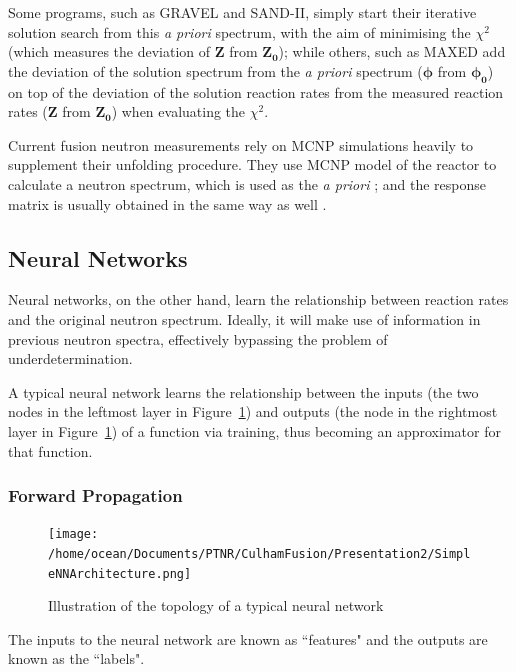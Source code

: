 \documentclass[a4paper, 12pt]{article}
\newcommand{\ve}[1]{\boldsymbol{#1}}
\begin{document}
Some programs, such as GRAVEL\cite{ManfredMatzkeHEPRO} and SAND-II\cite{SAND-II}, simply start their iterative solution search from this \emph{a priori} spectrum, with the aim of minimising the $\chi^2$ (which measures the deviation of $\ve{Z}$ from $\ve{Z_0}$); while others, such as MAXED \cite{MAXED1998Reginatto} add the deviation of the solution spectrum from the \emph{a priori} spectrum ($\ve{\phi}$ from $\ve{\phi_0}$) on top of the deviation of the solution reaction rates from the measured reaction rates ($\ve{Z}$ from $\ve{Z_0}$) when evaluating the $\chi^2$.

Current fusion neutron measurements rely on MCNP simulations heavily to supplement their unfolding procedure. They use MCNP model of the reactor to calculate a neutron spectrum, which is used as the \emph{a priori} \cite{MatzkeUnfoldingProcedure} \cite{InternalReportOnDeliverables_LWP}; and the response matrix is usually obtained in the same way as well \cite{bethColling_TBMD}.

\subsection{Neural Networks} \label{Neural Network Theory}
Neural networks, on the other hand, learn the relationship between reaction rates and the original neutron spectrum. Ideally, it will make use of information in previous neutron spectra, effectively bypassing the problem of underdetermination.

A typical neural network learns the relationship between the inputs (the two nodes in the leftmost layer in Figure~\ref{SimpleNNArchitecture}) and outputs (the node in the rightmost layer in Figure~\ref{SimpleNNArchitecture}) of a function via training, thus becoming an approximator for that function.

\subsubsection{Forward Propagation}
\begin{figure}[H]
    \centering
    \texttt{[image: /home/ocean/Documents/PTNR/CulhamFusion/Presentation2/SimpleNNArchitecture.png]}
    \caption{Illustration of the topology of a typical neural network} \label{SimpleNNArchitecture}
\end{figure}

The inputs to the neural network are known as ``features" and the outputs are known as the ``labels".
\end{document}
